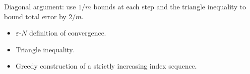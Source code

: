 \begin{remark*}
Diagonal argument: use $1/m$ bounds at each step and the triangle inequality to bound total error by $2/m$.
\end{remark*}

\begin{remark*}[Dependencies]
\begin{itemize}
  \item $\varepsilon$-$N$ definition of convergence.
  \item Triangle inequality.
  \item Greedy construction of a strictly increasing index sequence.
\end{itemize}
\end{remark*}
